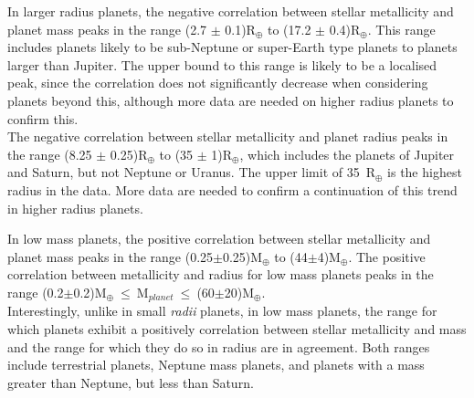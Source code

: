 \documentclass[a4paper,twocolumn,12pt]{article}
\begin{document}
In larger radius planets, the negative correlation between stellar metallicity and planet mass peaks in the range (2.7 $\pm$ 0.1)R$_\oplus$ to (17.2 $\pm$ 0.4)R$_\oplus$. This range includes planets likely to be sub-Neptune or super-Earth type planets to planets larger than Jupiter. The upper bound to this range is likely to be a localised peak, since the correlation does not significantly decrease when considering planets beyond this, although more data are needed on higher radius planets to confirm this.\\
The negative correlation between stellar metallicity and planet radius peaks in the range (8.25 $\pm$ 0.25)R$_\oplus$ to (35 $\pm$ 1)R$_\oplus$, which includes the planets of Jupiter and Saturn, but not Neptune or Uranus. The upper limit of 35~R$_\oplus$ is the highest radius in the data. More data are needed to confirm a continuation of this trend in higher radius planets.




In low mass planets, the positive correlation between stellar metallicity and planet mass peaks in the range (0.25$\pm$0.25)M$_{\oplus}$ to (44$\pm$4)M$_{\oplus}$. The positive correlation between metallicity and radius for low mass planets peaks in the range (0.2$\pm$0.2)M$_{\oplus}~\leq~$M$_{planet}~\leq~$(60$\pm$20)M$_{\oplus}$.\\
Interestingly, unlike in small \textit{radii} planets, in low mass planets, the range for which planets exhibit a positively correlation between stellar metallicity and mass and the range for which they do so in radius are in agreement. Both ranges include terrestrial planets, Neptune mass planets, and planets with a mass greater than Neptune, but less than Saturn.
\end{document}
